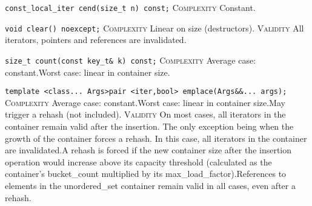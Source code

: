 \noindent{}\hspace*{0.25em}\lstinline[basicstyle=\ttfamily\color{cgreen}]{const_local_iter cend(size_t n) const;} \textsc{Complexity} Constant.\\\vspace{-0.6em}

\noindent{}\hspace*{0.25em}\lstinline[basicstyle=\ttfamily\color{corange}]{void clear() noexcept;} \textsc{Complexity} Linear on size (destructors). \textsc{Validity} All iterators, pointers and references are invalidated.\\\vspace{-0.6em}

\noindent{}\hspace*{0.25em}\lstinline[basicstyle=\ttfamily\color{corange}]{size_t count(const key_t& k) const;} \textsc{Complexity} Average case: constant.Worst case: linear in container size.\\\vspace{-0.6em}

\noindent{}\hspace*{0.25em}\lstinline[basicstyle=\ttfamily\color{corange}]{template <class... Args>pair <iter,bool> emplace(Args&&... args);} \textsc{Complexity} Average case: constant.Worst case: linear in container size.May trigger a rehash (not included). \textsc{Validity} On most cases, all iterators in the container remain valid after the insertion. The only exception being when the growth of the container forces a rehash. In this case, all iterators in the container are invalidated.A rehash is forced if the new container size after the insertion operation would increase above its capacity threshold (calculated as the container's bucket\_count multiplied by its max\_load\_factor).References to elements in the unordered\_set container remain valid in all cases, even after a rehash.\\\vspace{-0.6em}

